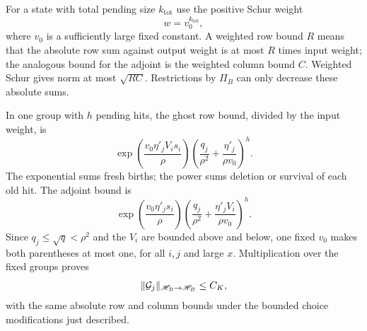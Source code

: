 For a state with total pending size $k_{\mathrm{tot}}$ use the positive
Schur weight
\begin{equation}\label{mem:schur-weight}
 w=v_0^{k_{\mathrm{tot}}},
\end{equation}
where $v_0$ is a sufficiently large fixed constant. A weighted row
bound $R$ means that the absolute row sum against output weight is
at most $R$ times input weight; the analogous bound for the adjoint is
the weighted column bound $C$. Weighted Schur gives norm at most
$\sqrt{RC}$. Restrictions by $\Pi_B$ can only decrease these absolute
sums.

In one group with $h$ pending hits, the ghost row bound, divided by
the input weight, is
\begin{equation}\label{mem:ghost-row}
 \exp\!\left(\frac{v_0\eta'_jV_i s_i}{\rho}\right)
 \left(\frac{q_j}{\rho^2}+\frac{\eta'_j}{\rho v_0}\right)^h.
\end{equation}
The exponential sums fresh births; the power sums deletion or survival
of each old hit. The adjoint bound is
\begin{equation}\label{mem:ghost-column}
 \exp\!\left(\frac{v_0\eta'_j s_i}{\rho}\right)
 \left(\frac{q_j}{\rho^2}+\frac{\eta'_jV_i}{\rho v_0}\right)^h.
\end{equation}
Since $q_j\le\sqrt q<\rho^2$ and the $V_i$ are bounded above and below,
one fixed $v_0$ makes both parentheses at most one, for all $i,j$ and
large $x$. Multiplication over the fixed groups proves
\begin{equation}\label{mem:ghost-norm}
 \lVert\mathcal G_j\rVert_{\mathscr H_B\to\mathscr H_B}\le C_K,
\end{equation}
with the same absolute row and column bounds under the bounded choice
modifications just described.

